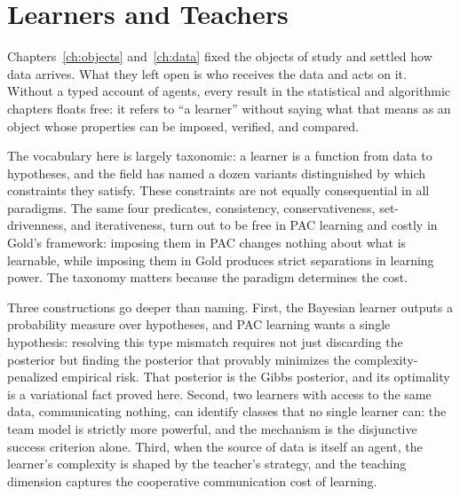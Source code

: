 
\chapter{Learners and Teachers}
\label{ch:agents}

Chapters~\ref{ch:objects} and~\ref{ch:data} fixed the objects of study and settled how data arrives. What they left open is who receives the data and acts on it. Without a typed account of agents, every result in the statistical and algorithmic chapters floats free: it refers to ``a learner'' without saying what that means as an object whose properties can be imposed, verified, and compared.

The vocabulary here is largely taxonomic: a learner is a function from data to hypotheses, and the field has named a dozen variants distinguished by which constraints they satisfy. These constraints are not equally consequential in all paradigms. The same four predicates, consistency, conservativeness, set-drivenness, and iterativeness, turn out to be free in PAC learning and costly in Gold's framework: imposing them in PAC changes nothing about what is learnable, while imposing them in Gold produces strict separations in learning power. The taxonomy matters because the paradigm determines the cost.

Three constructions go deeper than naming. First, the Bayesian learner outputs a probability measure over hypotheses, and PAC learning wants a single hypothesis: resolving this type mismatch requires not just discarding the posterior but finding the posterior that provably minimizes the complexity-penalized empirical risk. That posterior is the Gibbs posterior, and its optimality is a variational fact proved here. Second, two learners with access to the same data, communicating nothing, can identify classes that no single learner can: the team model is strictly more powerful, and the mechanism is the disjunctive success criterion alone. Third, when the source of data is itself an agent, the learner's complexity is shaped by the teacher's strategy, and the teaching dimension captures the cooperative communication cost of learning.

